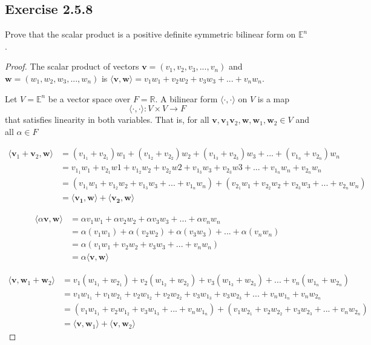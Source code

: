 \documentclass{tufte-book}
\theoremstyle{mytheoremstyle}
\theoremstyle{mylemstyle}
\theoremstyle{mydefstyle}
\begin{document}
\subsection{Exercise 2.5.8}
Prove that the scalar product is a positive definite symmetric bilinear form on $\mathbb{E}^n$.

\begin{proof}
The scalar product of vectors $\mathbf{v} = (v_1, v_2, v_3,...,v_n)$ and $\mathbf{w} = (w_1, w_2, w_3,...,w_n)$ is $\langle\mathbf{v}, \mathbf{w}\rangle = v_1w_1 + v_2w_2 + v_3w_3 +...+ v_nw_n$. 

Let $V = \mathbb{E}^n$ be a vector space over $F = \mathbb{R}$.  A bilinear form $\langle \cdot , \cdot \rangle$ on $V$ is a map 
\[\langle \cdot, \cdot \rangle : V \times V \rightarrow F \]
that satisfies linearity in both variables.  That is, for all $\mathbf{v},\mathbf{v}_1\mathbf{v}_2,\mathbf{w},\mathbf{w}_1,\mathbf{w}_2 \in V$ and all $\alpha \in F$

\begin{align*}
\langle\mathbf{v}_1+\mathbf{v}_2, \mathbf{w} \rangle &= (v_{1_{1}}+v_{2_{1}})w_1 + (v_{1_{2}}+v_{2_{2}})w_2 + (v_{1_{3}}+v_{2_{3}})w_3 +...+(v_{1_{n}}+v_{2_{n}})w_n  \\
&= v_{1_{1}}w_1 + v_{2_{1}}w1 + v_{1_{2}}w_2 + v_{2_{2}}w2 + v_{1_{3}}w_3 + v_{2_{3}}w3 +...+v_{1_{n}}w_n + v_{2_{n}}w_n \\
&= (v_{1_{1}}w_1 + v_{1_{2}}w_2 + v_{1_{3}}w_3 +...+v_{1_{n}}w_n) + (v_{2_{1}}w_1 + v_{2_{2}}w_2 + v_{2_{3}}w_3 +...+v_{2_{n}}w_n)\\
&= \langle\mathbf{v_1},\mathbf{w} \rangle + \langle\mathbf{v_2},\mathbf{w} \rangle
\end{align*}

\begin{align*}
\langle \alpha \mathbf{v},\mathbf{w} \rangle &= \alpha v_1 w_1 + \alpha v_2 w_2 + \alpha v_3 w_3 +...+ \alpha v_n w_n \\
&= \alpha(v_1w_1) + \alpha(v_2w_2) + \alpha(v_3w_3) +...+\alpha(v_nw_n) \\
&=\alpha (v_1w_1 + v_2w_2 + v_3w_3 +...+v_nw_n) \\
&= \alpha \langle \mathbf{v}, \mathbf{w} \rangle 
\end{align*}

\begin{align*}
\langle \mathbf{v}, \mathbf{w}_1+\mathbf{w}_2 \rangle &= v_1(w_{1_{1}}+w_{2_{1}}) + v_2(w_{1_{2}}+w_{2_{2}}) + v_3(w_{1_{3}}+w_{2_{3}}) +...+v_n(w_{1_{n}}+w_{2_{n}})  \\
&= v_1w_{1_{1}} + v_1w_{2_{1}} + v_2w_{1_{2}}+ v_2w_{2_{2}} + v_3w_{1_{3}}+ v_3w_{2_{3}} +...+v_nw_{1_{n}}+ v_nw_{2_{n}}\\
&= (v_1w_{1_{1}} + v_2w_{1_{2}} + v_3w_{1_{3}} +...+v_nw_{1_{n}}) +
(v_1w_{2_{1}} + v_2w_{2_{2}} + v_3w_{2_{3}} +...+v_nw_{2_{n}}) \\
&= \langle \mathbf{v}, \mathbf{w}_1 \rangle + \langle \mathbf{v}, \mathbf{w}_2 \rangle
\end{align*}


\end{proof}
\end{document}
